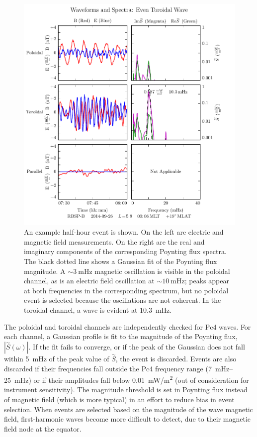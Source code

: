 \documentclass[draft,linenumbers]{agujournal}
\begin{document}
\begin{figure}
    \begin{center}
    \includegraphics[width=\textwidth]{figures/fig_event.pdf}
    \caption{
        An example half-hour event is shown. On the left are electric and magnetic field measurements. On the right are the real and imaginary components of the corresponding Poynting flux spectra. The black dotted line shows a Gaussian fit of the Poynting flux magnitude. A $\sim\SI{3}{\mHz}$ magnetic oscillation is visible in the poloidal channel, as is an electric field oscillation at $\sim\SI{10}{\mHz}$; peaks appear at both frequencies in the corresponding spectrum, but no poloidal event is selected because the oscillations are not coherent. In the toroidal channel, a wave is evident at \SI{10.3}{\mHz}.
    }
    \label{fig_event}
    \end{center}
\end{figure}

The poloidal and toroidal channels are independently checked for Pc4 waves. For each channel, a Gaussian profile is fit to the magnitude of the Poynting flux, $|\overset{\sim}{S}\left(\omega\right)|$. If the fit fails to converge, or if the peak of the Gaussian does not fall within \SI{5}{\mHz} of the peak value of $\overset{\sim}{S}$, the event is discarded. Events are also discarded if their frequencies fall outside the Pc4 frequency range (\SIrange{7}{25}{\mHz}) or if their amplitudes fall below \SI{0.01}{\mW/\m\squared} (out of consideration for instrument sensitivity). The magnitude threshold is set in Poynting flux instead of magnetic field (which is more typical) in an effort to reduce bias in event selection. When events are selected based on the magnitude of the wave magnetic field, first-harmonic waves become more difficult to detect, due to their magnetic field node at the equator\citep{dai_2015}.
\end{document}
